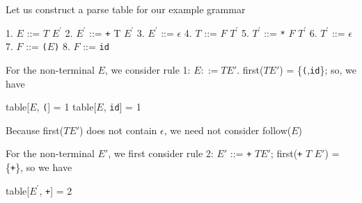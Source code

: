 \documentclass[8pt,a4paper,compress]{beamer}
\newcommand{\mm}[1]{$#1$}
\newcommand{\expo}[2]{$#1^{#2}$}
\newenvironment{spaced}
{
\smallskip
\hspace{.5cm}
\begin{minipage}[c]{\textwidth}
}
{
\end{minipage}
\smallskip
}
\begin{document}
\begin{frame}[fragile]
\pause

Let us construct a parse table for our example grammar

\text{ }
\begin{spaced}
\begin{production}
1. \mm{E}  ::= \mm{T} \expo{E}{\prime}
2. \expo{E}{\prime} ::= \lstinline{+} T \expo{E}{\prime}
3. \expo{E}{\prime} ::= \mm{\epsilon}
4. \mm{T}  ::= \mm{F} \expo{T}{\prime}
5. \expo{T}{\prime} ::= \lstinline{*} \mm{F} \expo{T}{\prime}
6. \expo{T}{\prime} ::= \mm{\epsilon}
7. \mm{F}  ::= \lstinline{(}\mm{E}\lstinline{)}
8. \mm{F}  ::= \lstinline{id}
\end{production}
\end{spaced}

\pause

For the non-terminal $E$, we consider rule 1: $E  ::= T E'$.  first($T E'$) = \{\lstinline{(},\lstinline{id}\}; so, we have

\text{ }
\begin{spaced}
\begin{production}
table[\mm{E}, \lstinline{(}] = 1
table[\mm{E}, \lstinline{id}] = 1
\end{production}
\end{spaced}

\pause

Because first($T E'$) does not contain $\epsilon$, we need not consider follow($E$)

\pause
\bigskip

For the non-terminal $E'$, we first consider rule 2: $E'$ ::= \lstinline{+} $T E'$; first(\lstinline{+} $T$ $E'$) = \{\lstinline{+}\}, so we have

\text{ }
\begin{spaced}
\begin{production}
table[\expo{E}{\prime}, \lstinline{+}] = 2
\end{production}
\end{spaced}
\end{frame}
\end{document}
